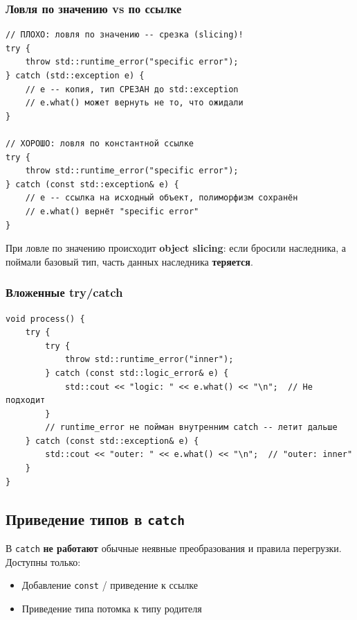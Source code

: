 \documentclass[a4paper,12pt]{article}
\begin{document}
\subsubsection{Ловля по значению vs по ссылке}

\begin{lstlisting}
// ПЛОХО: ловля по значению -- срезка (slicing)!
try {
    throw std::runtime_error("specific error");
} catch (std::exception e) {
    // e -- копия, тип СРЕЗАН до std::exception
    // e.what() может вернуть не то, что ожидали
}

// ХОРОШО: ловля по константной ссылке
try {
    throw std::runtime_error("specific error");
} catch (const std::exception& e) {
    // e -- ссылка на исходный объект, полиморфизм сохранён
    // e.what() вернёт "specific error"
}
\end{lstlisting}

При ловле по значению происходит \textbf{object slicing}: если бросили
наследника, а поймали базовый тип, часть данных наследника \textbf{теряется}.

\subsubsection{Вложенные try/catch}

\begin{lstlisting}
void process() {
    try {
        try {
            throw std::runtime_error("inner");
        } catch (const std::logic_error& e) {
            std::cout << "logic: " << e.what() << "\n";  // Не подходит
        }
        // runtime_error не пойман внутренним catch -- летит дальше
    } catch (const std::exception& e) {
        std::cout << "outer: " << e.what() << "\n";  // "outer: inner"
    }
}
\end{lstlisting}

\subsection{Приведение типов в \texttt{catch}}

В \texttt{catch} \textbf{не работают} обычные неявные преобразования
и правила перегрузки. Доступны только:
\begin{itemize}
    \item Добавление \texttt{const} / приведение к ссылке
    \item Приведение типа потомка к типу родителя
\end{itemize}
\end{document}
